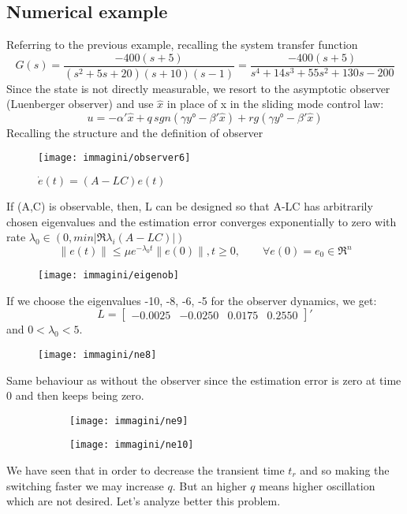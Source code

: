 \subsection{Numerical example}
Referring to the previous example, recalling the system transfer function 
\[
G(s)=\frac{-400(s+5)}{(s^2+5s+20)(s+10)(s-1)}=\frac{-400(s+5)}{s^4+14s^3+55s^2+130s-200}
\]Since the state is not directly measurable, we resort to the asymptotic observer (Luenberger observer) and use $\hat{x}$ in place of x in the sliding mode control law:
\[
u=-\alpha'\hat{x}+q\,sgn(\gamma y°-\beta'\hat{x})+rg(\gamma y°-\beta' \hat{x})
\]
Recalling the structure and the definition of observer
\begin{figure}[H]
	\centering
	\texttt{[image: immagini/observer6]}
	\caption{$\dot{e}(t)=(A-LC)e(t)$}
	\label{fig:observer6}
\end{figure}
If (A,C) is observable, then, L can be designed so that A-LC has arbitrarily chosen eigenvalues and
the estimation error converges exponentially to zero with rate $\lambda_0\in(0,min|\Re{\lambda_i(A-LC)}|)$
\[\|e(t)\|\le\mu e^{-\lambda_0t}\|e(0)\|,t\ge0,\qquad \forall e(0)=e_0\in \Re^n\]
\begin{figure}[H]
	\centering
	\texttt{[image: immagini/eigenob]}
	\label{fig:eigenob}
\end{figure}
If we choose the eigenvalues -10, -8, -6, -5 for the observer dynamics, we get: \[
L=\begin{bmatrix}
	-0.0025 & -0.0250 & 0.0175 & 0.2550
\end{bmatrix}'
\] and $0<\lambda_0<5$. 
\begin{figure}[H]
	\centering
	\texttt{[image: immagini/ne8]}
	\caption{}
	\label{fig:ne8}
\end{figure}
Same behaviour as without the observer since the estimation error is zero at time 0 and then keeps being zero.
\begin{figure}[H]
	\centering
	\begin{subfigure}[b]{0.3\textwidth}
		\centering
		\texttt{[image: immagini/ne9]}
		\label{fig:ne9}
	\end{subfigure}
\hfill
	\begin{subfigure}[b]{0.3\textwidth}
		\centering
		\texttt{[image: immagini/ne10]}
		\label{fig:ne10}
	\end{subfigure}
\hfill
\end{figure}
We have seen that in order to decrease the transient time $t_r$ and so making the switching faster we may increase $q$. But an higher $q$ means higher oscillation which are not desired. Let's analyze better this problem.
